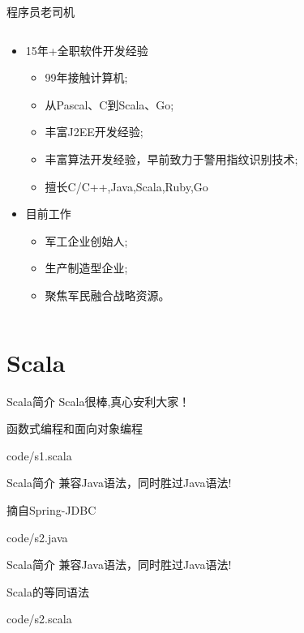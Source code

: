 \documentclass[10pt,aspectratio=43,mathserif,table]{beamer}
\begin{document}
\begin{frame}{程序员老司机}
\begin{columns}[T]
\begin{column}
\begin{itemize}
    \item<1-> 15年+全职软件开发经验
          \begin{itemize}
            \item<1-> 99年接触计算机;
            \item<1-> 从Pascal、C到Scala、Go;
            \item<1-> 丰富J2EE开发经验;
            \item<1-> 丰富算法开发经验，早前致力于警用指纹识别技术;
            \item<1-> 擅长C/C++,Java,Scala,Ruby,Go
          \end{itemize}
    \item<2-> 目前工作
          \begin{itemize}
            \item<2-> 军工企业创始人;
            \item<2-> 生产制造型企业;
            \item<2-> 聚焦军民融合战略资源。
          \end{itemize}
  \end{itemize}
\end{column}%
\end{columns}
\end{frame}


\section{Scala}  %

\begin{frame}{Scala简介}
  Scala很棒,真心安利大家！
\begin{block}{函数式编程和面向对象编程}
  
  {code/s1.scala}
\end{block}
\end{frame}

\begin{frame}{Scala简介}
  兼容Java语法，同时胜过Java语法!
\begin{block}{摘自Spring-JDBC}
  
  {code/s2.java}
\end{block}
\end{frame}
\begin{frame}{Scala简介}
  兼容Java语法，同时胜过Java语法!
\begin{block}{Scala的等同语法}
  
  {code/s2.scala}
\end{block}
\end{frame}
\end{document}
